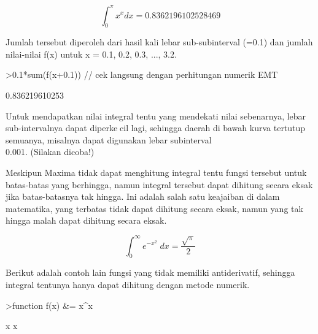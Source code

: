 \documentclass{article}
\begin{document}
\begin{eulernotebook}
\begin{eulercomment}
\begin{eulercomment}
\begin{eulercomment}
\begin{eulercomment}
\begin{eulercomment}
\begin{eulercomment}
\begin{eulercomment}
\begin{eulercomment}
\begin{eulercomment}
\begin{eulercomment}
\begin{eulercomment}
\end{eulercomment}
\begin{eulerformula}
\[
\int_{0}^{\pi}x^x dx=0.8362196102528469
\]
\end{eulerformula}
\begin{eulercomment}
Jumlah tersebut diperoleh dari hasil kali lebar sub-subinterval (=0.1)
dan jumlah nilai-nilai f(x) untuk x = 0.1, 0.2, 0.3, ..., 3.2.
\end{eulercomment}
\begin{eulerprompt}
>0.1*sum(f(x+0.1)) // cek langsung dengan perhitungan numerik EMT
\end{eulerprompt}
\begin{euleroutput}
  0.836219610253
\end{euleroutput}
\begin{eulercomment}
Untuk mendapatkan nilai integral tentu yang mendekati nilai
sebenarnya, lebar sub-intervalnya dapat diperkecil lagi, sehingga
daerah di bawah kurva tertutup semuanya, misalnya dapat digunakan
lebar subinterval\\
0.001. (Silakan dicoba!)

Meskipun Maxima tidak dapat menghitung integral tentu fungsi tersebut
untuk batas-batas yang berhingga, namun integral tersebut dapat
dihitung secara eksak jika batas-batasnya tak hingga. Ini adalah salah
satu keajaiban di dalam matematika, yang terbatas tidak dapat dihitung
secara eksak, namun yang tak hingga malah dapat dihitung secara eksak.
\end{eulercomment}
\begin{eulerformula}
\[
\int_{0}^{\infty }{e^ {- x^2 }\;dx}=\frac{\sqrt{\pi}}{2}
\]
\end{eulerformula}
\begin{eulercomment}
Berikut adalah contoh lain fungsi yang tidak memiliki antiderivatif,
sehingga integral tentunya hanya dapat dihitung dengan metode numerik.
\end{eulercomment}
\begin{eulerprompt}
>function f(x) &= x^x
\end{eulerprompt}
\begin{euleroutput}
  
                                     x
                                    x
  

\end{euleroutput}
\end{eulercomment}
\end{eulercomment}
\end{eulercomment}
\end{eulercomment}
\end{eulercomment}
\end{eulercomment}
\end{eulercomment}
\end{eulercomment}
\end{eulercomment}
\end{eulercomment}
\end{eulernotebook}
\end{document}
